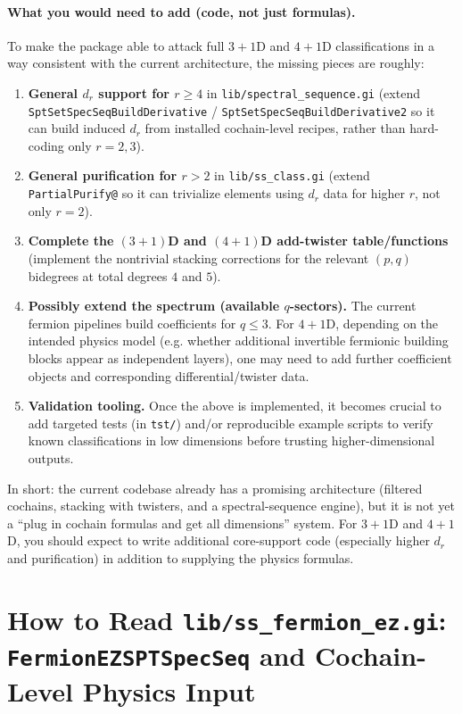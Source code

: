 \documentclass{SciPost}
\begin{document}
\paragraph{What you would need to add (code, not just formulas).}
To make the package able to attack full $3{+}1$D and $4{+}1$D classifications in a way consistent with the current architecture, the missing pieces are roughly:
\begin{enumerate}
    \item \textbf{General $d_r$ support for $r\ge 4$} in \texttt{lib/spectral\_sequence.gi} (extend \texttt{SptSetSpecSeqBuildDerivative} / \texttt{SptSetSpecSeqBuildDerivative2} so it can build induced $d_r$ from installed cochain-level recipes, rather than hard-coding only $r=2,3$).
    \item \textbf{General purification for $r>2$} in \texttt{lib/ss\_class.gi} (extend \texttt{PartialPurify@} so it can trivialize elements using $d_r$ data for higher $r$, not only $r=2$).
    \item \textbf{Complete the $(3{+}1)$D and $(4{+}1)$D add-twister table/functions} (implement the nontrivial stacking corrections for the relevant $(p,q)$ bidegrees at total degrees $4$ and $5$).
    \item \textbf{Possibly extend the spectrum (available $q$-sectors).} The current fermion pipelines build coefficients for $q\le 3$.
    For $4{+}1$D, depending on the intended physics model (e.g. whether additional invertible fermionic building blocks appear as independent layers), one may need to add further coefficient objects and corresponding differential/twister data.
    \item \textbf{Validation tooling.} Once the above is implemented, it becomes crucial to add targeted tests (in \texttt{tst/}) and/or reproducible example scripts to verify known classifications in low dimensions before trusting higher-dimensional outputs.
\end{enumerate}

In short: the current codebase already has a promising architecture (filtered cochains, stacking with twisters, and a spectral-sequence engine), but it is not yet a ``plug in cochain formulas and get all dimensions'' system.
For $3{+}1$D and $4{+}1$D, you should expect to write additional core-support code (especially higher $d_r$ and purification) in addition to supplying the physics formulas.

\section{How to Read \texttt{lib/ss\_fermion\_ez.gi}: \texttt{FermionEZSPTSpecSeq} and Cochain-Level Physics Input}
\label{sec:ss-fermion-ez-walkthrough}
\end{document}
